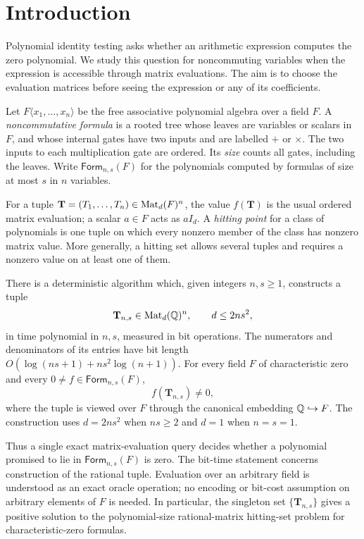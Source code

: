 \section{Introduction}
\label{sec:introduction}

Polynomial identity testing asks whether an arithmetic expression computes
the zero polynomial. We study this question for noncommuting variables when
the expression is accessible through matrix evaluations. The aim is to choose
the evaluation matrices before seeing the expression or any of its coefficients.

Let $F\langle x_1,\ldots,x_n\rangle$ be the free associative polynomial algebra
over a field $F$. A \emph{noncommutative formula} is a rooted tree whose leaves
are variables or scalars in $F$, and whose internal gates have two inputs and
are labelled $+$ or $\times$. The two inputs to each multiplication gate are
ordered. Its \emph{size} counts all gates, including the leaves. Write
$\mathsf{Form}_{n,s}(F)$ for the polynomials computed by formulas of size at
most $s$ in $n$ variables.

For a tuple $\mathbf T=(T_1,\ldots,T_n)\in\operatorname{Mat}_d(F)^n$, the value
$f(\mathbf T)$ is the usual ordered matrix evaluation; a scalar $a\in F$
acts as $aI_d$. A \emph{hitting point} for a class of polynomials is one tuple
on which every nonzero member of the class has nonzero matrix value.
More generally, a hitting set allows several tuples and requires a nonzero
value on at least one of them.

\begin{theorem}\label{thm:main}
There is a deterministic algorithm which, given integers $n,s\ge1$,
constructs a tuple
\[
 \mathbf T_{n,s}\in\operatorname{Mat}_d(\mathbb{Q})^n,
 \qquad d\le 2ns^2,
\]
in time polynomial in $n,s$, measured in bit operations. The numerators and
denominators of its entries have bit length
$O(\log(ns+1)+ns^2\log(n+1))$.
For every field $F$ of characteristic zero and every
$0\ne f\in\mathsf{Form}_{n,s}(F)$,
\[
 f(\mathbf T_{n,s})\ne0,
\]
where the tuple is viewed over $F$ through the canonical embedding
$\mathbb{Q}\hookrightarrow F$. The construction uses $d=2ns^2$ when $ns\ge2$
and $d=1$ when $n=s=1$.
\end{theorem}

Thus a single exact matrix-evaluation query decides whether a polynomial
promised to lie in $\mathsf{Form}_{n,s}(F)$ is zero. The bit-time statement
concerns construction of the rational tuple. Evaluation over an arbitrary
field is understood as an exact oracle operation; no encoding or bit-cost
assumption on arbitrary elements of $F$ is needed. In particular, the singleton
set $\{\mathbf T_{n,s}\}$ gives a positive solution to the polynomial-size
rational-matrix hitting-set problem for characteristic-zero formulas.

